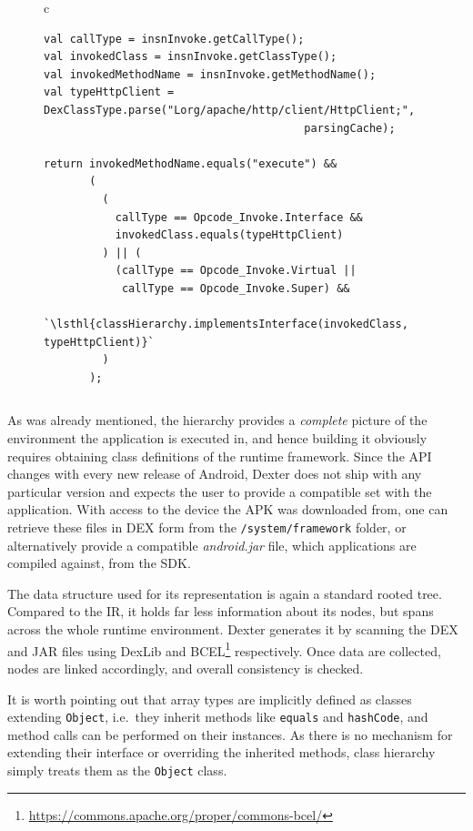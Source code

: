 \documentclass[12pt,twoside,notitlepage]{report}
\newcommand{\highlight}[1]{\colorbox{lightOrange}{\strut #1}}
\newcommand{\lsthl}[1] {\ttfamily\scriptsize\highlight{#1}}
\newcommand{\weblink}[1] {\footnote{\scriptsize\url{#1}}}
\begin{document}
\begin{figure}[h]
	\centering
	\begin{tabular}{c}
	\begin{lstlisting}
val callType = insnInvoke.getCallType();
val invokedClass = insnInvoke.getClassType();
val invokedMethodName = insnInvoke.getMethodName();
val typeHttpClient = DexClassType.parse("Lorg/apache/http/client/HttpClient;", 
                                        parsingCache);

return invokedMethodName.equals("execute") &&
       (
         (
           callType == Opcode_Invoke.Interface && 
           invokedClass.equals(typeHttpClient)
         ) || (
           (callType == Opcode_Invoke.Virtual || 
           	callType == Opcode_Invoke.Super) && 
           `\lsthl{classHierarchy.implementsInterface(invokedClass, typeHttpClient)}`
         )
       );
	\end{lstlisting}
	\end{tabular}
	\begin{lstlisting}[caption={Code that decides whether a method call should be instrumented as an Apache HTTP Client sink},
	                   label={listing:Sink_ApacheHTTPClient_CanBeApplied}]
	\end{lstlisting}
\end{figure}

As was already mentioned, the hierarchy provides a \emph{complete} picture of the environment the application is executed in, and hence building it obviously requires obtaining class definitions of the runtime framework. Since the API changes with every new release of Android, Dexter does not ship with any particular version and expects the user to provide a compatible set with the application. With access to the device the APK was downloaded from, one can retrieve these files in DEX form from the \verb$/system/framework$ folder, or alternatively provide a compatible \emph{android.jar} file, which applications are compiled against, from the SDK. 

The data structure used for its representation is again a standard rooted tree. Compared to the IR, it holds far less information about its nodes, but spans across the whole runtime environment. Dexter generates it by scanning the DEX and JAR files using DexLib and BCEL\weblink{https://commons.apache.org/proper/commons-bcel/} respectively. Once data are collected, nodes are linked accordingly, and overall consistency is checked.

It is worth pointing out that array types are implicitly defined as classes extending \verb$Object$, i.e.\ they inherit methods like \verb$equals$ and \verb$hashCode$, and method calls can be performed on their instances. As there is no mechanism for extending their interface or overriding the inherited methods, class hierarchy simply treats them as the \verb$Object$ class.
\end{document}
